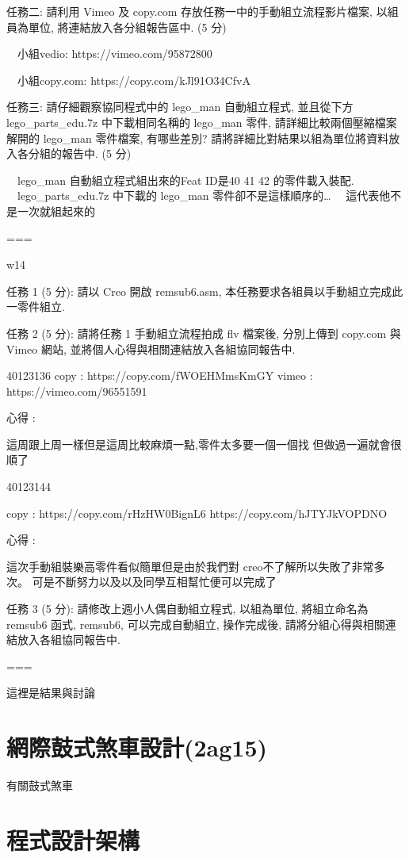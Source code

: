 \documentclass[]{article}
\begin{document}
任務二: 請利用 Vimeo 及 copy.com 存放任務一中的手動組立流程影片檔案,
以組員為單位, 將連結放入各分組報告區中. (5 分)

　小組vedio: https://vimeo.com/95872800

　小組copy.com: https://copy.com/kJl91O34CfvA

任務三: 請仔細觀察協同程式中的 lego\_man 自動組立程式, 並且從下方
lego\_parts\_edu.7z 中下載相同名稱的 lego\_man 零件,
請詳細比較兩個壓縮檔案解開的 lego\_man 零件檔案, 有哪些差別?
請將詳細比對結果以組為單位將資料放入各分組的報告中. (5 分)

　lego\_man 自動組立程式組出來的Feat ID是40 41 42 的零件載入裝配.
　lego\_parts\_edu.7z 中下載的 lego\_man 零件卻不是這樣順序的\ldots{}
　這代表他不是一次就組起來的

===

w14

任務 1 (5 分): 請以 Creo 開啟 remsub6.asm,
本任務要求各組員以手動組立完成此一零件組立.

任務 2 (5 分): 請將任務 1 手動組立流程拍成 flv 檔案後, 分別上傳到
copy.com 與 Vimeo 網站, 並將個人心得與相關連結放入各組協同報告中.

40123136 copy : https://copy.com/fWOEHMmsKmGY vimeo :
https://vimeo.com/96551591

心得 :

這周跟上周一樣但是這周比較麻煩一點,零件太多要一個一個找
但做過一遍就會很順了

40123144

copy : https://copy.com/rHzHW0BignL6 https://copy.com/hJTYJkVOPDNO

心得 :

這次手動組裝樂高零件看似簡單但是由於我們對
creo不了解所以失敗了非常多次。
可是不斷努力以及以及同學互相幫忙便可以完成了

任務 3 (5 分): 請修改上週小人偶自動組立程式, 以組為單位, 將組立命名為
remsub6 函式, remsub6, 可以完成自動組立, 操作完成後,
請將分組心得與相關連結放入各組協同報告中.

===

這裡是結果與討論

\section{網際鼓式煞車設計(2ag15)}\label{ux7db2ux969bux9f13ux5f0fux715eux8ecaux8a2dux8a082ag15}

有關鼓式煞車

\section{程式設計架構}\label{ux7a0bux5f0fux8a2dux8a08ux67b6ux69cb-2}
\end{document}
